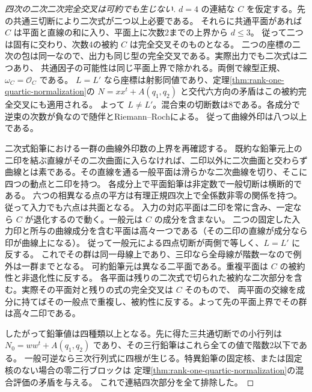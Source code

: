 \begin{proof}[四次の二次二次完全交叉は可約でも生じない]
$d=4$ の連結な $C$ を仮定する。先の共通三切断により二次式が二つ以上必要である。
それらに共通平面があれば $C$ は平面と直線の和に入り、平面上に次数2までの上界から $d\le3$。
従って二つは固有に交わり、次数4の被約 $C$ は完全交叉そのものとなる。
二つの座標の二次の包は同一なので、出力も同じ型の完全交叉である。実際出力でも二次式は二つあり、
共通因子の可能性は同じ平面上界で除かれる。両側で線型正規、$\omega_C=\mathcal O_C$ である。
$L=L'$ なら座標は射影同値であり、定理\ref{thm:rank-one-quartic-normalization}の
$N=xx^t+A(q_1,q_2)$ と交代六方向の矛盾はこの被約完全交叉にも適用される。
よって $L\ne L'$。混合束の切断数は8である。各成分で逆束の次数が負なので随伴とRiemann--Rochによる。
従って曲線外印は八つ以上である。

二次式鉛筆における一群の曲線外印数の上界を再確認する。
既約な鉛筆元上の二印を結ぶ直線がその二次曲面に入らなければ、二印以外に二次曲面と交わらず
曲線とは素である。その直線を通る一般平面は滑らかな二次曲線を切り、そこに四つの動点と二印を持つ。
各成分上で平面鉛筆は非定数で一般切断は横断的である。
六つの相異なる点の平方は有理正規四次上で全係数非零の関係を持つ。従って入力でも六点は共面となる。
入力の対応平面は二印を常に含み、一定なら $C$ が退化するので動く。一般元は $C$ の成分を含まない。
二つの固定した入力印と所与の曲線成分を含む平面は高々一つである（その二印の直線が成分なら印が曲線上になる）。
従って一般元による四点切断が両側で等しく、$L=L'$ に反する。
これでその群は同一母線上であり、三印なら全母線が階数一なので例外は一群までとなる。
可約鉛筆元は異なる二平面である。重複平面は $C$ の被約性と非退化性に反する。
各平面は残りの二次式で切られた被約な二次部分を含む。実際その平面対と残りの式の完全交叉は $C$ そのもので、
両平面の交線を成分に持てばその一般点で重複し、被約性に反する。よって先の平面上界でその群は高々二印である。

したがって鉛筆値は四種類以上となる。先に得た三共通切断での小行列は
$N_0=ww^t+A(q_1,q_2)$ であり、その三行鉛筆はこれら全ての値で階数2以下である。
一般可逆なら三次行列式に四根が生じる。特異鉛筆の固定核、または固定核のない場合の零二行ブロックは
定理\ref{thm:rank-one-quartic-normalization}の混合評価の矛盾を与える。
これで連結四次部分を全て排除した。
\end{proof}
